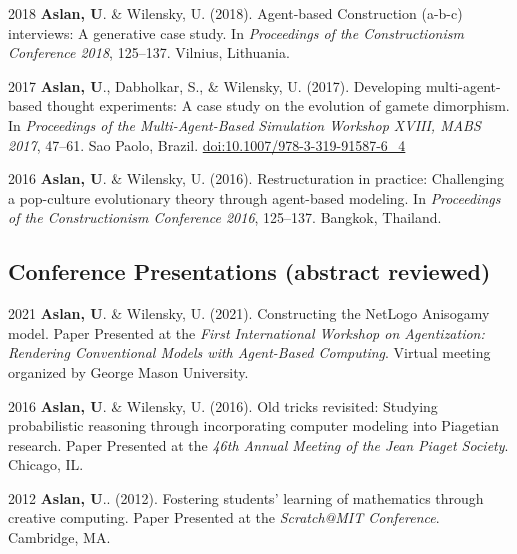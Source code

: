 \documentclass[11pt,letterpaper]{report} %
\begin{document}
\begin{tablist}
        \item[2018] \tab{}\textbf{Aslan, U}. \& Wilensky, U. (2018). Agent-based Construction (a-b-c) interviews: A generative case study. In \textit{Proceedings of the Constructionism Conference 2018}, 125--137. Vilnius, Lithuania.

        \item[2017] \tab{}\textbf{Aslan, U}., Dabholkar, S., \& Wilensky, U. (2017). Developing multi-agent-based thought experiments: A case study on the evolution of gamete dimorphism. In \textit{Proceedings of the Multi-Agent-Based Simulation Workshop XVIII, MABS 2017}, 47--61. Sao Paolo, Brazil. \href{https://doi.org/10.1007/978-3-319-91587-6\_4}{doi:10.1007/978-3-319-91587-6\_4}

        \item[2016] \tab{}\textbf{Aslan, U}. \& Wilensky, U. (2016). Restructuration in practice: Challenging a pop-culture evolutionary theory through agent-based modeling. In \textit{Proceedings of the Constructionism Conference 2016}, 125--137. Bangkok, Thailand.


    \end{tablist}

    \subsection*{Conference Presentations (abstract reviewed)}

    \begin{tablist}

        \item[2021] \tab{}\textbf{Aslan, U}. \& Wilensky, U. (2021). Constructing the NetLogo Anisogamy model. Paper Presented at the \textit{First International Workshop on Agentization: Rendering Conventional Models with Agent-Based Computing}. Virtual meeting organized by George Mason University.

        \item[2016] \tab{}\textbf{Aslan, U}. \& Wilensky, U. (2016). Old tricks revisited: Studying probabilistic reasoning through incorporating computer modeling into Piagetian research. Paper Presented at the \textit{46th Annual Meeting of the Jean Piaget Society}. Chicago, IL.

        \item[2012] \tab{}\textbf{Aslan, U}.. (2012). Fostering students' learning of mathematics through creative computing. Paper Presented at the \textit{Scratch@MIT Conference}. Cambridge, MA.

    \end{tablist}
\end{document}
